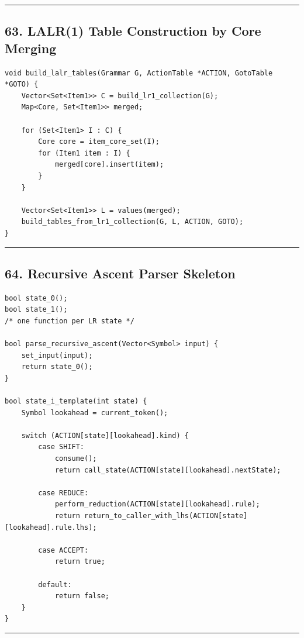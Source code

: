 \documentclass[10pt,letterpaper]{article}
\begin{document}
\medskip\hrule\medskip

\subsection*{63. LALR(1) Table Construction by Core Merging}

\begin{verbatim}
void build_lalr_tables(Grammar G, ActionTable *ACTION, GotoTable *GOTO) {
    Vector<Set<Item1>> C = build_lr1_collection(G);
    Map<Core, Set<Item1>> merged;

    for (Set<Item1> I : C) {
        Core core = item_core_set(I);
        for (Item1 item : I) {
            merged[core].insert(item);
        }
    }

    Vector<Set<Item1>> L = values(merged);
    build_tables_from_lr1_collection(G, L, ACTION, GOTO);
}
\end{verbatim}

\medskip\hrule\medskip

\subsection*{64. Recursive Ascent Parser Skeleton}

\begin{verbatim}
bool state_0();
bool state_1();
/* one function per LR state */

bool parse_recursive_ascent(Vector<Symbol> input) {
    set_input(input);
    return state_0();
}

bool state_i_template(int state) {
    Symbol lookahead = current_token();

    switch (ACTION[state][lookahead].kind) {
        case SHIFT:
            consume();
            return call_state(ACTION[state][lookahead].nextState);

        case REDUCE:
            perform_reduction(ACTION[state][lookahead].rule);
            return return_to_caller_with_lhs(ACTION[state][lookahead].rule.lhs);

        case ACCEPT:
            return true;

        default:
            return false;
    }
}
\end{verbatim}

\medskip\hrule\medskip
\end{document}
